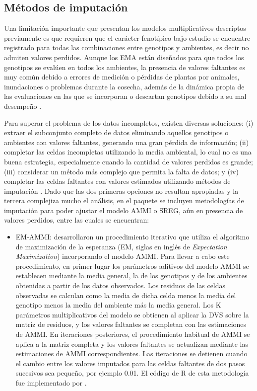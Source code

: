 \subsection{Métodos de imputación}

Una limitación importante que presentan los modelos multiplicativos descriptos previamente es que requieren que el carácter fenotípico bajo estudio se encuentre registrado para todas las combinaciones entre genotipos y ambientes, es decir no admiten valores perdidos. Aunque los EMA están diseñados para que todos los genotipos se evalúen en todos los ambientes, la presencia de valores faltantes es muy común debido a errores de medición o pérdidas de plantas por animales, inundaciones o problemas durante la cosecha, además de la dinámica propia de las evaluaciones en las que se incorporan o descartan genotipos debido a su mal desempeño \citep{HillRosenberg1985}.

Para superar el problema de los datos incompletos, existen diversas soluciones: (i) extraer el subconjunto completo de datos eliminando aquellos genotipos o ambientes con valores faltantes, generando una gran pérdida de información; (ii) completar las celdas incompletas utilizando la media ambiental, lo cual no es una buena estrategia, especialmente cuando la cantidad de valores perdidos es grande; (iii) considerar un método más complejo que permita la falta de datos; y (iv) completar las celdas faltantes con valores estimados utilizando métodos de imputación \citep{GauchZobel1990, Troyanskayaetal2001,Alarconetal2010, Paderewski2013, Alarconetal2014, JosseHusson2016, Alarconetal2020}. Dado que las dos primeras opciones no resultan apropiadas y la tercera complejiza mucho el análisis, en el paquete se incluyen metodologías de imputación para poder ajustar el modelo AMMI o SREG, aún en presencia de valores perdidos, entre las cuales se encuentran: 

\begin{itemize}
\item EM-AMMI: \citet{GauchZobel1990} desarrollaron un procedimiento iterativo que utiliza el algoritmo de maximización de la esperanza (EM, siglas en inglés de \emph{Expectation Maximization}) incorporando el modelo AMMI. Para llevar a cabo este procedimiento, en primer lugar los parámetros aditivos del modelo AMMI se establecen mediante la media general, la de los genotipos y de los ambientes obtenidas a partir de los datos observados. Los residuos de las celdas observadas se calculan como la media de dicha celda menos la media del genotipo menos la media del ambiente más la media general. Los K parámetros multiplicativos del modelo se obtienen al aplicar la DVS sobre la matriz de residuos, y los valores faltantes se completan con las estimaciones de AMMI. En iteraciones posteriores, el procedimiento habitual de AMMI se aplica a la matriz completa y los valores faltantes se actualizan mediante las estimaciones de AMMI correspondientes. Las iteraciones se detienen cuando el cambio entre los valores imputados para las celdas faltantes de dos pasos sucesivos sea pequeño, por ejemplo 0.01. El código de R de esta metodología fue implementado por \citet{Paderewski2013}.
\end{itemize}

